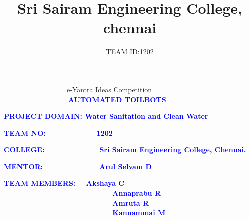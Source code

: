 \documentclass{beamer}
\title{Sri Sairam Engineering College, chennai}
\author{TEAM ID:1202}
\begin{document}
\begin{frame}{    \   \   \    \   \    \   \   \    \   \    \    \    \   \   \      \    \   \      e-Yantra Ideas Competition\\     \textbf{\textcolor{blue}{     \   \   \    \   \    \   \   \    \   \    \    \    \   \   \      \  AUTOMATED TOILBOTS}}}






\textbf{\textcolor{blue}{PROJECT DOMAIN: Water Sanitation and Clean Water}}

\textbf{\textcolor{blue}{TEAM NO: \   \    \   \   \    \   \    \    \    \   \   \       1202}}

\textbf{\textcolor{blue}{COLLEGE: \   \   \      \   \   \   \    \    \     \         \       \     \    Sri Sairam Engineering College, Chennai.}}

\textcolor{blue}{\textbf{MENTOR:\   \    \   \   \    \   \    \    \    \   \   \     \   \      Arul Selvam D}}


\textbf{\textcolor{blue}{TEAM MEMBERS:   \    \         Akshaya C\\   \        \    \  \       \    \   \    \    \    \   \   \    \   \    \   \   \    \   \    \    \    \   \   \      \   \   \             Annaprabu R\\     \   \    \     \    \     \    \    \   \   \    \    \   \   \  \  \   \    \    \     \   \    \    \   \   \   \     \         Amruta R\\     \   \         \    \   \    \    \    \   \   \    \   \       \   \    \    \   \    \   \    \    \       \      \    \     \   \   \    Kannammai M}}





\end{frame}
\end{document}
